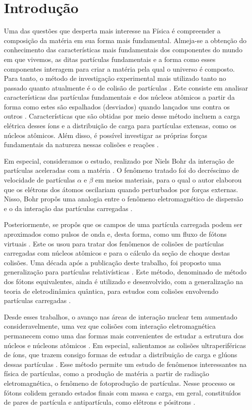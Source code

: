 \chapter{Introdução}

Uma das questões que desperta mais interesse na Física é compreender a
composição da matéria em sua forma mais fundamental.  Almeja-se a obtenção do
conhecimento das características mais fundamentais dos componentes do mundo em
que vivemos, as ditas partículas fundamentais e a forma como esses componentes
interagem para criar a matéria pela qual o universo é composto. Para tanto, o
método de investigação experimental mais utilizado tanto no passado quanto
atualmente é o de colisão de partículas \cite{griffiths_particle}. Este
consiste em analisar características das partículas fundamentais e dos núcleos
atômicos a partir da forma como estes são espalhados (desviados) quando
lançados uns contra os outros \cite{thomson_particle}.  Características que são
obtidas por meio desse método incluem a carga elétrica desses íons e a
distribuição de carga para partículas extensas, como os núcleos atômicos. Além
disso, é possível investigar as próprias forças fundamentais da natureza nessas
colisões e reações \cite{griffiths_particle}.

Em especial, consideramos o estudo, realizado por Niels Bohr da interação de
partículas aceleradas com a matéria \cite{bohr1913}. O
fenômeno tratado foi do decréscimo de velocidade de partículas $\alpha$ e
$\beta$ em meios materiais, para o qual o autor elaborou que os elétrons dos
átomos oscilariam quando perturbados por forças externas. Nisso,
Bohr propôs uma analogia entre o fenômeno
eletromagnético de dispersão e o da interação das partículas carregadas .

Posteriormente, se propôs que os campos de uma partícula carregada podem ser
aproximados como pulsos de onda e, desta forma, como um fluxo de fótons
virtuais \cite{Fermi1924}. Este os usou para tratar dos fenômenos de colisões
de partículas carregadas com núcleos atômicos e para o cálculo da seção de
choque destas colisões. Uma década após a publicação deste trabalho, foi
proposto uma generalização para partículas relativísticas \cite{williams1933}.
Este método, denominado de método dos fótons equivalentes, ainda é utilizado e
desenvolvido, com a generalização na teoria de eletrodinâmica quântica, para
estudos com colisões envolvendo partículas carregadas \cite{BALTZ20081}.

Desde esses trabalhos, o avanço nas áreas de interação nuclear tem aumentado
consideravelmente, uma vez que colisões com interação eletromagnética
permanecem como uma das formas mais convenientes de estudar a estrutura dos
núcleos e núcleons atômicos \cite{harland-lang2023}. Em especial, salientamos
as colisões ultraperiféricas de íons, que trazem consigo formas de estudar a
distribuição de carga e glúons dessas partículas \cite{bertulani2005}. Esse
método permite um estudo de fenômenos interessantes na física de partículas,
como a produção de matéria a partir de radiação eletromagnética, o fenômeno de
fotoprodução de partículas. Nesse processo os fótons colidem gerando estados
finais com massa e carga, em geral, constituídos de pares de partícula e
antipartícula, como elétrons e pósitrons \cite{Gerhard_Baur_1998}.

